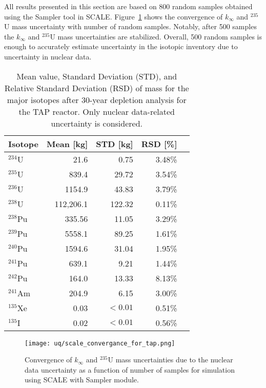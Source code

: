 All results presented in this section are based on 800 random samples obtained 
using the Sampler tool in SCALE. Figure~\ref{fig:uq-scale-convergence} 
shows the convergence of $k_{\infty}$ and $^{235}$U mass uncertainty with 
number of random samples. Notably, after 500 samples the $k_{\infty}$ and 
$^{235}$U mass uncertainties are stabilized. Overall, 500 random samples is 
enough to accurately estimate uncertainty in the isotopic inventory due to 
uncertainty in nuclear data. 

\begin{table}[hbp!]
	\centering
	\caption{Mean value, Standard Deviation (STD), and Relative Standard 
		Deviation (RSD) of mass for the major isotopes after 30-year depletion 
		analysis for the \gls{TAP} reactor. Only nuclear data-related 
		uncertainty is considered.}
	\begin{tabularx}{0.7\textwidth}{L R R R R}
		\hline
		\textbf{Isotope}  & \textbf{Mean [kg]} & \textbf{STD [kg]} & 
		\textbf{RSD [\%]}\\ \hline
		$^{234}$U  & 21.6  & 0.75  & 3.48\% \\
		$^{235}$U  & 839.4 & 29.72 & 3.54\% \\
		$^{236}$U  & 1154.9& 43.83 & 3.79\% \\
		$^{238}$U  & 112,206.1 & 122.32 & 0.11\% \\
		$^{238}$Pu & 335.56& 11.05 & 3.29\% \\
		$^{239}$Pu & 5558.1& 89.25 & 1.61\% \\
		$^{240}$Pu & 1594.6& 31.04 & 1.95\% \\
		$^{241}$Pu & 639.1 & 9.21  & 1.44\% \\
		$^{242}$Pu & 164.0 & 13.33 & 8.13\% \\
		$^{241}$Am & 204.9 & 6.15  & 3.00\% \\
		$^{135}$Xe & 0.03  &$<0.01$& 0.51\% \\
		$^{135}$I  & 0.02  &$<0.01$& 0.56\% \\ \hline
	\end{tabularx}
	\label{tab:uq-scale-mean-std-rsd}
	\vspace{-0.9em}
\end{table}


\begin{figure}[hbp!] %
	\centering
	\texttt{[image: uq/scale\_convergance\_for\_tap.png]}
	\caption{Convergence of $k_{\infty}$ and $^{235}$U mass uncertainties due 
	to the nuclear data uncertainty as a function of number of samples for 
	simulation using SCALE with Sampler module.}
	\label{fig:uq-scale-convergence}
\end{figure}

